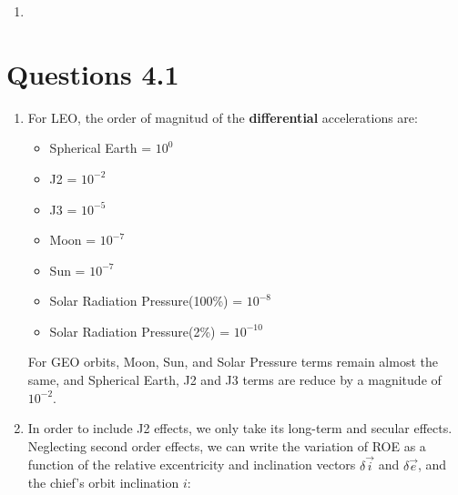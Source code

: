 \documentclass[a4paper]{article}
\begin{document}
\begin{enumerate}[label=\emph{\alph*)}]
  \item %


\end{enumerate}

\section{Questions 4.1}

\begin{enumerate}[label=\emph{\alph*)}]
  \item %
    For LEO, the order of magnitud of the \textbf{differential} accelerations are:
    \begin{itemize}
      \item Spherical Earth = $10^0$
      \item J2 = $10^{-2}$
      \item J3 = $10^{-5}$
      \item Moon = $10^{-7}$
      \item Sun = $10^{-7}$
      \item Solar Radiation Pressure(100\%) = $10^{-8}$
      \item Solar Radiation Pressure(2\%) = $10^{-10}$
    \end{itemize}
    For GEO orbits, Moon, Sun, and Solar Pressure terms remain almost the same, and Spherical Earth, J2 and J3 terms are reduce by a magnitude of $10^{-2}$.

  \item %
    In order to include J2 effects, we only take its long-term and secular effects. Neglecting second order effects, we can write the variation of ROE as a function of the relative excentricity and inclination vectors $\delta \vec{i}$ and $\delta \vec{e}$, and the chief's orbit inclination $i$:


\end{enumerate}
\end{document}
